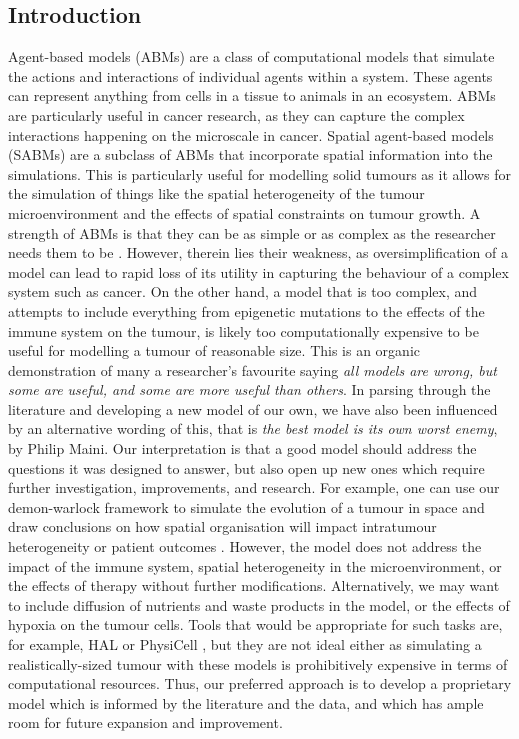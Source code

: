 \subsection{Introduction}
Agent-based models (ABMs) are a class of computational models that simulate the actions and interactions of individual
agents within a system. These agents can represent anything from cells in a tissue to animals in an ecosystem. ABMs
are particularly useful in cancer research, as they can capture the complex interactions happening on the microscale in
cancer. Spatial agent-based models (SABMs) are a subclass of ABMs that incorporate spatial information into the
simulations. This is particularly useful for modelling solid tumours as it allows for the simulation of things like
the spatial heterogeneity of the tumour microenvironment and the effects of spatial constraints on tumour growth.
A strength of ABMs is that they can be as simple or as complex as the researcher needs them to be \cite{colyer_seven-step_2023}.
However, therein lies their weakness, as oversimplification of a model can lead to rapid loss of its utility in
capturing the behaviour of a complex system such as cancer. On the other hand, a model that is too complex, and
attempts to include everything from epigenetic mutations to the effects of the immune system on the tumour, is likely
too computationally expensive to be useful for modelling a tumour of reasonable size. This is an organic demonstration
of many a researcher's favourite saying \textit{all models are wrong, but some are useful, and some are more useful
than others}. In parsing through the literature and developing a new model of our own, we have also been influenced
by an alternative wording of this, that is \textit{the best model is its own worst enemy}, by Philip Maini. Our
interpretation is that a good model should address the questions it was designed to answer, but also open up new
ones which require further investigation, improvements, and research. For example, one can use our demon-warlock
framework \cite{bak_warlock_2023} to simulate the evolution of a tumour in space and draw conclusions on how
spatial organisation will impact intratumour heterogeneity or patient outcomes \cite{noble_when_2020, noble_spatial_2022}.
However, the model does not address the impact of the immune system, spatial heterogeneity in the microenvironment,
or the effects of therapy without further modifications. Alternatively, we may want to include diffusion of
nutrients and waste products in the model, or the effects of hypoxia on the tumour cells. Tools that would be
appropriate for such tasks are, for example, HAL \cite{bravo_hybrid_2020} or PhysiCell \cite{ghaffarizadeh_physicell_2018},
but they are not ideal either as simulating a realistically-sized tumour with these models is prohibitively expensive
in terms of computational resources. Thus, our preferred approach is to develop a proprietary model which is
informed by the literature and the data, and which has ample room for future expansion and improvement.


